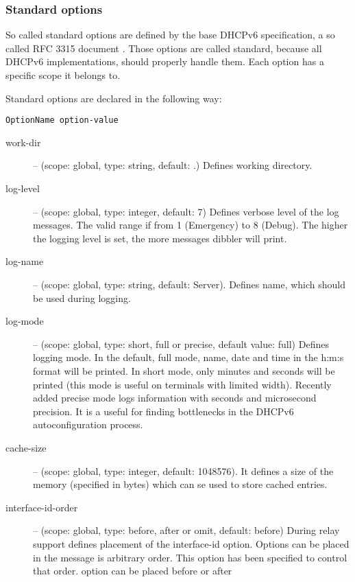 \subsubsection{Standard options}

So called standard options are defined by the base DHCPv6 specification,
a so called RFC 3315 document \cite{rfc3315}. Those options are
called standard, because all DHCPv6 implementations, should properly
handle them. Each option has a specific scope it belongs to. 

Standard options are declared in the following way:

\begin{verbatim}
OptionName option-value
\end{verbatim}

\begin{description}
 \item[work-dir] -- (scope: global, type: string, default: .) Defines working
	    directory.
 \item[log-level] -- (scope: global, type: integer, default: 7) Defines
	    verbose level of the log messages. The valid range if
	    from 1 (Emergency) to 8 (Debug). The higher the logging
	    level is set, the more messages dibbler will print.
 \item[log-name] -- (scope: global, type: string, default: Server). Defines 
	    name, which should be used during logging.
 \item[log-mode] -- (scope: global, type: short, full or precise,
	    default value: full) Defines logging mode. In the
	    default, full mode, name, date and time in the h:m:s format
	    will be printed. In short mode, only minutes and
	    seconds will be printed (this mode is useful on
	    terminals with limited width). Recently added precise
	    mode logs information with seconds and microsecond
	    precision. It is a useful for finding bottlenecks in
	    the DHCPv6 autoconfiguration process.
 \item[cache-size] -- (scope: global, type: integer, default:
	    1048576). It defines a size of the memory (specified in
            bytes) which can se used to store cached entries.
\item[interface-id-order] -- (scope: global, type: before, after or omit, 
        default: before) During relay support defines placement of the
        interface-id option. Options can be placed in the 
        message is arbitrary order. This option has been specified to control
        that order.  option can be placed before or after

\end{description}
